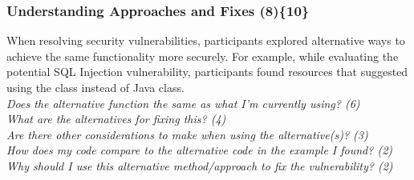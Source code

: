 \documentclass[10pt,journal,compsoc]{IEEEtran}
\begin{document}


\subsubsection{Understanding Approaches and Fixes (8)\{10\}}\label{uafa}

When resolving security vulnerabilities, participants explored alternative ways to achieve the same functionality more securely.
For example, while evaluating the potential SQL Injection vulnerability, participants found resources that suggested using the  class instead of Java  class. 
\\

\noindent\emph{Does the alternative function the same as what I'm currently using? (6)} \\
\emph{What are the alternatives for fixing this? (4)} \\
\emph{Are there other considerations to make when using the alternative(s)? (3)} \\
\emph{How does my code compare to the alternative code in the example I found? (2)} \\
\emph{Why should I use this alternative method/approach to fix the vulnerability? (2)} 
\\
 
\end{document}
